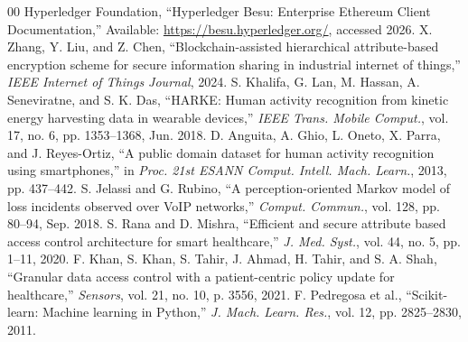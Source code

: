 \documentclass[conference]{IEEEtran}
\begin{document}
\begin{thebibliography}{00}
 Hyperledger Foundation, ``Hyperledger Besu: Enterprise Ethereum Client Documentation,'' Available: \url{https://besu.hyperledger.org/}, accessed 2026.
 X. Zhang, Y. Liu, and Z. Chen, ``Blockchain-assisted hierarchical attribute-based encryption scheme for secure information sharing in industrial internet of things,'' \textit{IEEE Internet of Things Journal}, 2024.
 S. Khalifa, G. Lan, M. Hassan, A. Seneviratne, and S. K. Das, ``HARKE: Human activity recognition from kinetic energy harvesting data in wearable devices,'' \textit{IEEE Trans. Mobile Comput.}, vol. 17, no. 6, pp. 1353--1368, Jun. 2018.
 D. Anguita, A. Ghio, L. Oneto, X. Parra, and J. Reyes-Ortiz, ``A public domain dataset for human activity recognition using smartphones,'' in \textit{Proc. 21st ESANN Comput. Intell. Mach. Learn.}, 2013, pp. 437--442.
 S. Jelassi and G. Rubino, ``A perception-oriented Markov model of loss incidents observed over VoIP networks,'' \textit{Comput. Commun.}, vol. 128, pp. 80--94, Sep. 2018.
 S. Rana and D. Mishra, ``Efficient and secure attribute based access control architecture for smart healthcare,'' \textit{J. Med. Syst.}, vol. 44, no. 5, pp. 1--11, 2020.
 F. Khan, S. Khan, S. Tahir, J. Ahmad, H. Tahir, and S. A. Shah, ``Granular data access control with a patient-centric policy update for healthcare,'' \textit{Sensors}, vol. 21, no. 10, p. 3556, 2021.
 F. Pedregosa et al., ``Scikit-learn: Machine learning in Python,'' \textit{J. Mach. Learn. Res.}, vol. 12, pp. 2825--2830, 2011.
\end{thebibliography}
\end{document}
